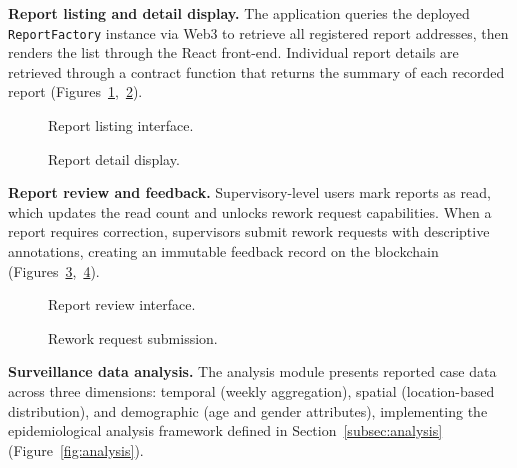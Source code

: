 \documentclass[AMA,LATO1COL]{WileyNJD-v2}
\begin{document}
\textbf{Report listing and detail display.} The application queries the deployed \texttt{ReportFactory} instance via Web3 to retrieve all registered report addresses, then renders the list through the React front-end. Individual report details are retrieved through a contract function that returns the summary of each recorded report (Figures~\ref{fig:list},~\ref{fig:detail}).

\begin{figure}[!ht]
\centering
{}
\caption{Report listing interface.}\label{fig:list}
\end{figure}

\begin{figure}[!ht]
\centering
{}
\caption{Report detail display.}\label{fig:detail}
\end{figure}

\textbf{Report review and feedback.} Supervisory-level users mark reports as read, which updates the read count and unlocks rework request capabilities. When a report requires correction, supervisors submit rework requests with descriptive annotations, creating an immutable feedback record on the blockchain (Figures~\ref{fig:review},~\ref{fig:feedback}).

\begin{figure}[!ht]
\centering
{}
\caption{Report review interface.}\label{fig:review}
\end{figure}

\begin{figure}[!ht]
\centering
{}
\caption{Rework request submission.}\label{fig:feedback}
\end{figure}

\textbf{Surveillance data analysis.} The analysis module presents reported case data across three dimensions: temporal (weekly aggregation), spatial (location-based distribution), and demographic (age and gender attributes), implementing the epidemiological analysis framework defined in Section~\ref{subsec:analysis} (Figure~\ref{fig:analysis}).
\end{document}

